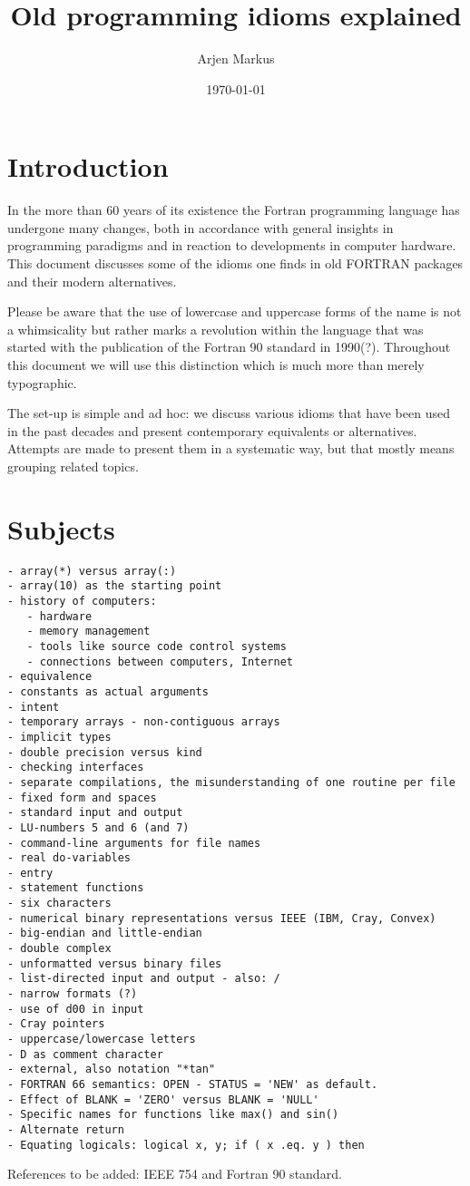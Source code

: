\documentclass{article}
\date{\today}
\author{Arjen Markus}
\title{Old programming idioms explained}
\begin{document}
\maketitle

\section{Introduction}
In the more than 60 years of its existence the Fortran programming
language has undergone many changes, both in accordance with general insights
in programming paradigms and in reaction to developments in computer hardware.
This document discusses some of the idioms one finds in old FORTRAN packages
and their modern alternatives.

Please be aware that the use of lowercase and uppercase forms of the name is
not a whimsicality but rather marks a revolution within the language that was
started with the publication of the Fortran 90 standard in 1990(?). Throughout
this document we will use this distinction which is much more than merely
typographic.

The set-up is simple and ad hoc: we discuss various idioms that have been
used in the past decades and present contemporary equivalents or alternatives.
Attempts are made to present them in a systematic way, but that mostly means grouping
related topics.









\section{Subjects}
\begin{verbatim}
- array(*) versus array(:)
- array(10) as the starting point
- history of computers:
   - hardware
   - memory management
   - tools like source code control systems
   - connections between computers, Internet
- equivalence
- constants as actual arguments
- intent
- temporary arrays - non-contiguous arrays
- implicit types
- double precision versus kind
- checking interfaces
- separate compilations, the misunderstanding of one routine per file
- fixed form and spaces
- standard input and output
- LU-numbers 5 and 6 (and 7)
- command-line arguments for file names
- real do-variables
- entry
- statement functions
- six characters
- numerical binary representations versus IEEE (IBM, Cray, Convex)
- big-endian and little-endian
- double complex
- unformatted versus binary files
- list-directed input and output - also: /
- narrow formats (?)
- use of d00 in input
- Cray pointers
- uppercase/lowercase letters
- D as comment character
- external, also notation "*tan"
- FORTRAN 66 semantics: OPEN - STATUS = 'NEW' as default.
- Effect of BLANK = 'ZERO' versus BLANK = 'NULL'
- Specific names for functions like max() and sin()
- Alternate return
- Equating logicals: logical x, y; if ( x .eq. y ) then
\end{verbatim}


References to be added: IEEE 754 and Fortran 90 standard.
\end{document}

